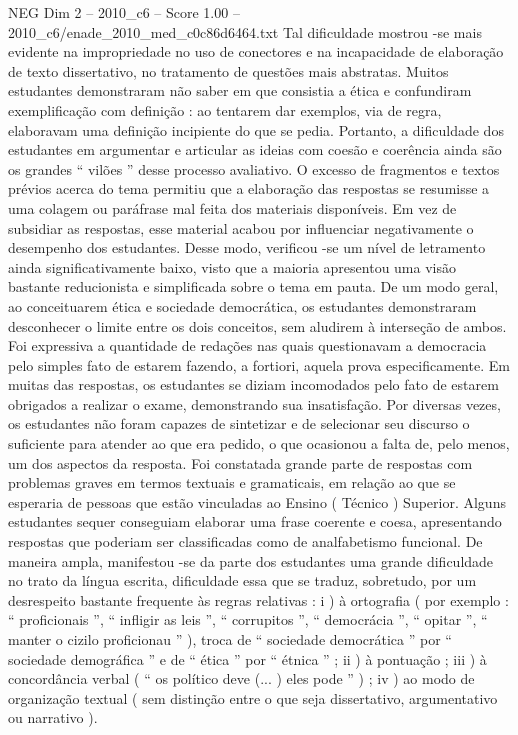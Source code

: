 \begin{textsample}{NEG Dim 2 – 2010\_c6 – Score 1.00 – 2010\_c6/enade\_2010\_med\_c0c86d6464.txt}
Tal dificuldade mostrou -se mais evidente na impropriedade no uso de conectores e na incapacidade de elaboração de texto dissertativo, no tratamento de questões mais abstratas.
Muitos estudantes demonstraram não saber em que consistia a ética e confundiram exemplificação com definição : ao tentarem dar exemplos, via de regra, elaboravam uma definição incipiente do que se pedia.
Portanto, a dificuldade dos estudantes em argumentar e articular as ideias com coesão e coerência ainda são os grandes “ vilões ” desse processo avaliativo.
O excesso de fragmentos e textos prévios acerca do tema permitiu que a elaboração das respostas se resumisse a uma colagem ou paráfrase mal feita dos materiais disponíveis.
Em vez de subsidiar as respostas, esse material acabou por influenciar negativamente o desempenho dos estudantes.
Desse modo, verificou -se um nível de letramento ainda significativamente baixo, visto que a maioria apresentou uma visão bastante reducionista e simplificada sobre o tema em pauta.
De um modo geral, ao conceituarem ética e sociedade democrática, os estudantes demonstraram desconhecer o limite entre os dois conceitos, sem aludirem à interseção de ambos.
Foi expressiva a quantidade de redações nas quais questionavam a democracia pelo simples fato de estarem fazendo, a fortiori, aquela prova especificamente.
Em muitas das respostas, os estudantes se diziam incomodados pelo fato de estarem obrigados a realizar o exame, demonstrando sua insatisfação.
Por diversas vezes, os estudantes não foram capazes de sintetizar e de selecionar seu discurso o suficiente para atender ao que era pedido, o que ocasionou a falta de, pelo menos, um dos aspectos da resposta.
Foi constatada grande parte de respostas com problemas graves em termos textuais e gramaticais, em relação ao que se esperaria de pessoas que estão vinculadas ao Ensino ( Técnico ) Superior.
Alguns estudantes sequer conseguiam elaborar uma frase coerente e coesa, apresentando respostas que poderiam ser classificadas como de analfabetismo funcional.
De maneira ampla, manifestou -se da parte dos estudantes uma grande dificuldade no trato da língua escrita, dificuldade essa que se traduz, sobretudo, por um desrespeito bastante frequente às regras relativas : i ) à ortografia ( por exemplo : “ proficionais ”, “ infligir as leis ”, “ corrupitos ”, “ democrácia ”, “ opitar ”, “ manter o cizilo proficionau ” ), troca de “ sociedade democrática ” por “ sociedade demográfica ” e de “ ética ” por “ étnica ” ; ii ) à pontuação ; iii ) à concordância verbal ( “ os político deve (... ) eles pode ” ) ; iv ) ao modo de organização textual ( sem distinção entre o que seja dissertativo, argumentativo ou narrativo ).

\end{textsample}

